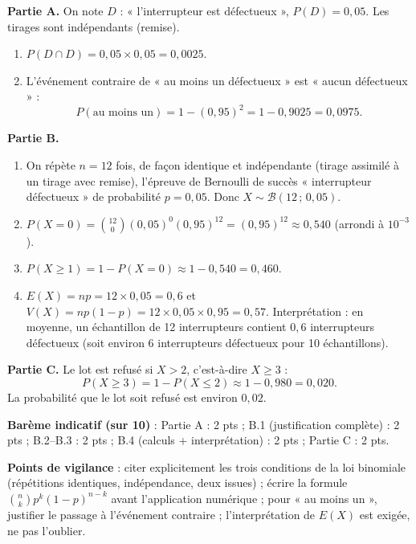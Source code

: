 \documentclass[11pt]{article}
\begin{document}
\begin{corrige}
\textbf{Partie A.} On note $D$ : « l'interrupteur est défectueux », $P(D)=0,05$. Les tirages sont indépendants (remise).
\begin{enumerate}
\item $P(D\cap D)=0,05\times0,05=0,0025$.
\item L'événement contraire de « au moins un défectueux » est « aucun défectueux » :
\[P(\text{au moins un})=1-(0,95)^2=1-0,9025=0,0975.\]
\end{enumerate}
\textbf{Partie B.}
\begin{enumerate}
\item On répète $n=12$ fois, de façon identique et indépendante (tirage assimilé à un tirage avec remise), l'épreuve de Bernoulli de succès « interrupteur défectueux » de probabilité $p=0,05$. Donc $X\sim\mathcal{B}(12\,;\,0,05)$.
\item $P(X=0)=\binom{12}{0}(0,05)^0(0,95)^{12}=(0,95)^{12}\approx0,540$ (arrondi à $10^{-3}$).
\item $P(X\geq1)=1-P(X=0)\approx1-0,540=0,460$.
\item $E(X)=np=12\times0,05=0,6$ et $V(X)=np(1-p)=12\times0,05\times0,95=0,57$. Interprétation : en moyenne, un échantillon de 12 interrupteurs contient $0,6$ interrupteurs défectueux (soit environ 6 interrupteurs défectueux pour 10 échantillons).
\end{enumerate}
\textbf{Partie C.} Le lot est refusé si $X>2$, c'est-à-dire $X\geq3$ :
\[P(X\geq3)=1-P(X\leq2)\approx1-0,980=0,020.\]
La probabilité que le lot soit refusé est environ $0,02$.

\textbf{Barème indicatif (sur 10)} : Partie A : 2 pts ; B.1 (justification complète) : 2 pts ; B.2–B.3 : 2 pts ; B.4 (calculs + interprétation) : 2 pts ; Partie C : 2 pts.

\textbf{Points de vigilance} : citer explicitement les trois conditions de la loi binomiale (répétitions identiques, indépendance, deux issues) ; écrire la formule $\binom{n}{k}p^k(1-p)^{n-k}$ avant l'application numérique ; pour « au moins un », justifier le passage à l'événement contraire ; l'interprétation de $E(X)$ est exigée, ne pas l'oublier.
\end{corrige}
\end{document}

